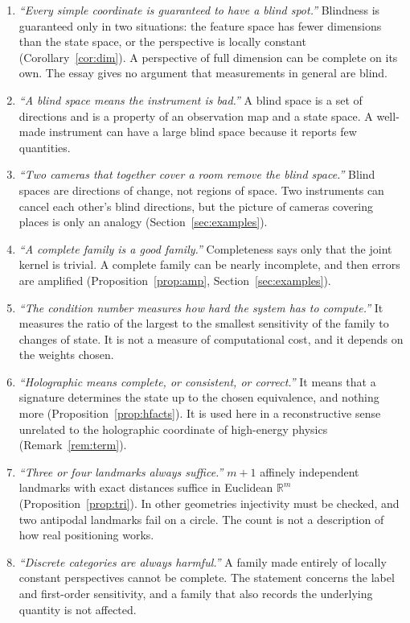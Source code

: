 \documentclass[11pt]{article}
\theoremstyle{remark}
\newcommand{\R}{\mathbb{R}}
\begin{document}
\begin{enumerate}[label=\textbf{M\arabic*.},leftmargin=2.2em,itemsep=4pt]
\item \emph{``Every simple coordinate is guaranteed to have a blind spot.''} Blindness is guaranteed only in two situations: the feature space has fewer dimensions than the state space, or the perspective is locally constant (Corollary~\ref{cor:dim}). A perspective of full dimension can be complete on its own. The essay gives no argument that measurements in general are blind.
\item \emph{``A blind space means the instrument is bad.''} A blind space is a set of directions and is a property of an observation map and a state space. A well-made instrument can have a large blind space because it reports few quantities.
\item \emph{``Two cameras that together cover a room remove the blind space.''} Blind spaces are directions of change, not regions of space. Two instruments can cancel each other's blind directions, but the picture of cameras covering places is only an analogy (Section~\ref{sec:examples}).
\item \emph{``A complete family is a good family.''} Completeness says only that the joint kernel is trivial. A complete family can be nearly incomplete, and then errors are amplified (Proposition~\ref{prop:amp}, Section~\ref{sec:examples}).
\item \emph{``The condition number measures how hard the system has to compute.''} It measures the ratio of the largest to the smallest sensitivity of the family to changes of state. It is not a measure of computational cost, and it depends on the weights chosen.
\item \emph{``Holographic means complete, or consistent, or correct.''} It means that a signature determines the state up to the chosen equivalence, and nothing more (Proposition~\ref{prop:hfacts}). It is used here in a reconstructive sense unrelated to the holographic coordinate of high-energy physics (Remark~\ref{rem:term}).
\item \emph{``Three or four landmarks always suffice.''} $m+1$ affinely independent landmarks with exact distances suffice in Euclidean $\R^m$ (Proposition~\ref{prop:tri}). In other geometries injectivity must be checked, and two antipodal landmarks fail on a circle. The count is not a description of how real positioning works.
\item \emph{``Discrete categories are always harmful.''} A family made entirely of locally constant perspectives cannot be complete. The statement concerns the label and first-order sensitivity, and a family that also records the underlying quantity is not affected.

\end{enumerate}
\end{document}
